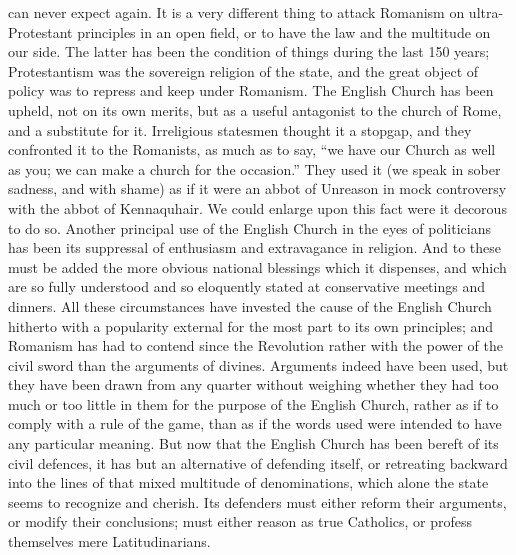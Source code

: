 can never expect again. It is a very different thing to attack Romanism
on ultra-Protestant principles in an open field, or to have the law and
the multitude on our side. The latter has been the condition of things
during the last 150 years; Protestantism was the sovereign religion of
the state, and the great object of policy was to repress and keep under
Romanism. The English Church has been upheld, not on its own merits, but
as a useful antagonist to the church of Rome, and a substitute for it.
Irreligious statesmen thought it a stopgap, and they confronted it to
the Romanists, as much as to say, ``we have our Church as well as you;
we can make a church for the occasion.'' They used it (we speak in
sober sadness, and with shame) as if it were an abbot of Unreason in
mock controversy with the abbot of Kennaquhair. We could enlarge upon
this fact were it decorous to do so. Another principal use of the
English Church in the eyes of politicians has been its suppressal of
enthusiasm and extravagance in religion. And to these must be added the
more obvious national blessings which it dispenses, and which are so
fully understood and so eloquently stated at conservative meetings and
dinners. All these circumstances have invested the cause of the English
Church hitherto with a popularity external for the most part to its own
principles; and Romanism has had to contend since the Revolution rather
with the power of the civil sword than the arguments of divines.
Arguments indeed have been used, but they have been drawn from any
quarter without weighing whether they had too much or too little in them
for the purpose of the English Church, rather as if to comply with a
rule of the game, than as if the words used were intended to have any
particular meaning. But now that the English Church has been bereft of
its civil defences, it has but an alternative of defending itself, or
retreating backward into the lines of that mixed multitude of
denominations, which alone the state seems to recognize and cherish. Its
defenders must either reform their arguments, or modify their
conclusions; must either reason as true Catholics, or profess themselves
mere Latitudinarians.

